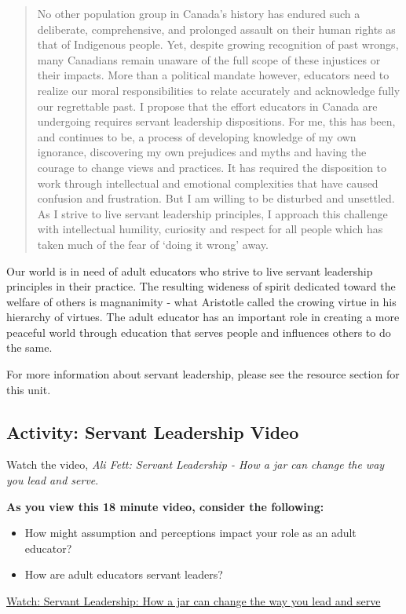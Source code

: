\documentclass[
]{book}
\providecommand{\tightlist}{%
  \setlength{\itemsep}{0pt}\setlength{\parskip}{0pt}}
\begin{document}
\begin{quote}
No other population group in Canada's history has endured such a deliberate, comprehensive, and prolonged assault on their human rights as that of Indigenous people. Yet, despite growing recognition of past wrongs, many Canadians remain unaware of the full scope of these injustices or their impacts. More than a political mandate however, educators need to realize our moral responsibilities to relate accurately and acknowledge fully our regrettable past. I propose that the effort educators in Canada are undergoing requires servant leadership dispositions. For me, this has been, and continues to be, a process of developing knowledge of my own ignorance, discovering my own prejudices and myths and having the courage to change views and practices. It has required the disposition to work through intellectual and emotional complexities that have caused confusion and frustration. But I am willing to be disturbed and unsettled. As I strive to live servant leadership principles, I approach this challenge with intellectual humility, curiosity and respect for all people which has taken much of the fear of `doing it wrong' away.
\end{quote}

Our world is in need of adult educators who strive to live servant leadership principles in their practice. The resulting wideness of spirit dedicated toward the welfare of others is magnanimity - what Aristotle called the crowing virtue in his hierarchy of virtues. The adult educator has an important role in creating a more peaceful world through education that serves people and influences others to do the same.

For more information about servant leadership, please see the resource section for this unit.

\hypertarget{activity-servant-leadership-video}{%
\subsection*{Activity: Servant Leadership Video}\label{activity-servant-leadership-video}}

\begin{reflect}
Watch the video, \emph{Ali Fett: Servant Leadership - How a jar can change the way
you lead and serve}.

\textbf{As you view this 18 minute video, consider the following:}

\begin{itemize}
\tightlist
\item
  How might assumption and perceptions impact your role as an adult educator?\\
\item
  How are adult educators servant leaders?
\end{itemize}

\href{https://www.youtube.com/watch?v=1vIPrR_clEg}{Watch: Servant Leadership: How a jar can change the way you lead and serve}
\end{reflect}
\end{document}
